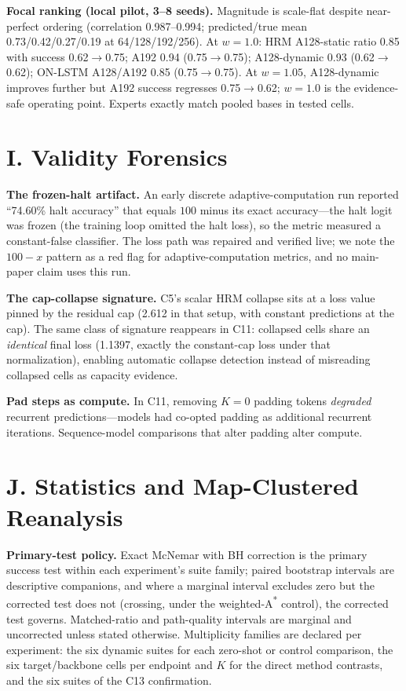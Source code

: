 \documentclass[letterpaper]{article} %
\newcommand{\stage}[1]{\textsc{#1}}
\begin{document}
\textbf{Focal ranking (local pilot, 3--8 seeds).} Magnitude is scale-flat despite near-perfect ordering (correlation 0.987--0.994; predicted/true mean 0.73/0.42/0.27/0.19 at 64/128/192/256). At $w{=}1.0$: HRM A128-static ratio 0.85 with success 0.62$\to$0.75; A192 0.94 (0.75$\to$0.75); A128-dynamic 0.93 (0.62$\to$0.62); ON-LSTM A128/A192 0.85 (0.75$\to$0.75). At $w{=}1.05$, A128-dynamic improves further but A192 success regresses 0.75$\to$0.62; $w{=}1.0$ is the evidence-safe operating point. Experts exactly match pooled bases in tested cells.

\section{I. Validity Forensics}

\textbf{The frozen-halt artifact.} An early discrete adaptive-computation run reported ``74.60\% halt accuracy'' that equals $100$ minus its exact accuracy---the halt logit was frozen (the training loop omitted the halt loss), so the metric measured a constant-false classifier. The loss path was repaired and verified live; we note the $100{-}x$ pattern as a red flag for adaptive-computation metrics, and no main-paper claim uses this run.

\textbf{The cap-collapse signature.} \stage{C5}'s scalar HRM collapse sits at a loss value pinned by the residual cap (2.612 in that setup, with constant predictions at the cap). The same class of signature reappears in \stage{C11}: collapsed cells share an \emph{identical} final loss (1.1397, exactly the constant-cap loss under that normalization), enabling automatic collapse detection instead of misreading collapsed cells as capacity evidence.

\textbf{Pad steps as compute.} In \stage{C11}, removing $K{=}0$ padding tokens \emph{degraded} recurrent predictions---models had co-opted padding as additional recurrent iterations. Sequence-model comparisons that alter padding alter compute.

\section{J. Statistics and Map-Clustered Reanalysis}

\textbf{Primary-test policy.} Exact McNemar with BH correction is the primary success test within each experiment's suite family; paired bootstrap intervals are descriptive companions, and where a marginal interval excludes zero but the corrected test does not (crossing, under the weighted-A\textsuperscript{*} control), the corrected test governs. Matched-ratio and path-quality intervals are marginal and uncorrected unless stated otherwise. Multiplicity families are declared per experiment: the six dynamic suites for each zero-shot or control comparison, the six target/backbone cells per endpoint and $K$ for the direct method contrasts, and the six suites of the \stage{C13} confirmation.
\end{document}
